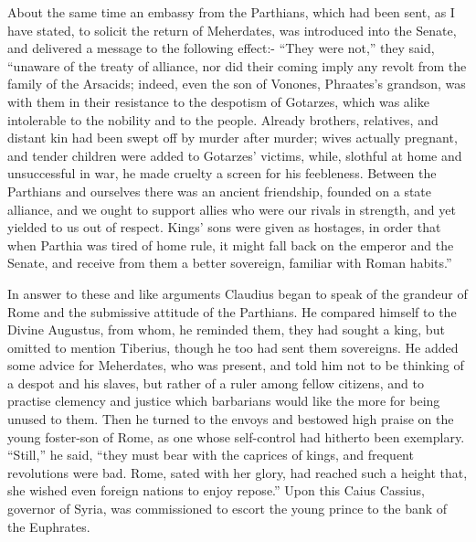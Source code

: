 
About the same time an embassy from the Parthians, which had been sent, as I have stated, to solicit the return of Meherdates, was introduced into the Senate, and delivered a message to the following effect:- ``They were not,'' they said, ``unaware of the treaty of alliance, nor did their coming imply any revolt from the family of the Arsacids; indeed, even the son of Vonones, Phraates's grandson, was with them in their resistance to the despotism of Gotarzes, which was alike intolerable to the nobility and to the people. Already brothers, relatives, and distant kin had been swept off by murder after murder; wives actually pregnant, and tender children were added to Gotarzes' victims, while, slothful at home and unsuccessful in war, he made cruelty a screen for his feebleness. Between the Parthians and ourselves there was an ancient friendship, founded on a state alliance, and we ought to support allies who were our rivals in strength, and yet yielded to us out of respect. Kings' sons were given as hostages, in order that when Parthia was tired of home rule, it might fall back on the emperor and the Senate, and receive from them a better sovereign, familiar with Roman habits.''


In answer to these and like arguments Claudius began to speak of the grandeur of Rome and the submissive attitude of the Parthians. He compared himself to the Divine Augustus, from whom, he reminded them, they had sought a king, but omitted to mention Tiberius, though he too had sent them sovereigns. He added some advice for Meherdates, who was present, and told him not to be thinking of a despot and his slaves, but rather of a ruler among fellow citizens, and to practise clemency and justice which barbarians would like the more for being unused to them. Then he turned to the envoys and bestowed high praise on the young foster-son of Rome, as one whose self-control had hitherto been exemplary. ``Still,'' he said, ``they must bear with the caprices of kings, and frequent revolutions were bad. Rome, sated with her glory, had reached such a height that, she wished even foreign nations to enjoy repose.'' Upon this Caius Cassius, governor of Syria, was commissioned to escort the young prince to the bank of the Euphrates.



